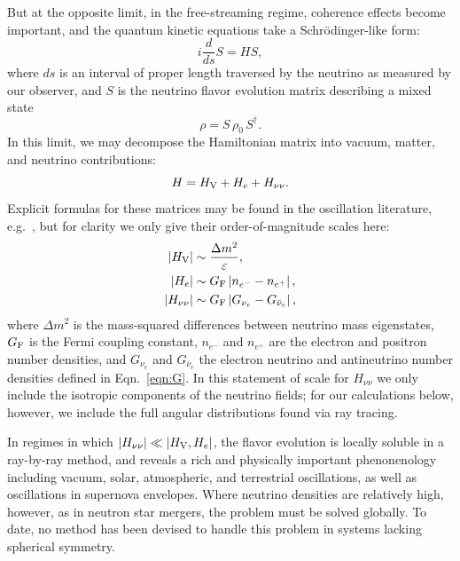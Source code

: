 \documentclass[aps,floatfix,prd,superscriptaddress,twocolumn]{revtex4-1}
\begin{document}
But at the opposite limit, in the free-streaming regime,
coherence effects become important,
and the quantum kinetic equations take a Schr\"{o}dinger-like form:
\begin{equation}
  \label{eqn:schroedinger}
  i \frac{d}{ds} S = H S,
\end{equation}
where $ds$ is an interval of proper length traversed by the neutrino as
measured by our observer, and
$S$ is the neutrino flavor evolution matrix describing a mixed state
\begin{equation}
  \label{eq:density_evolution}
  \rho = S \, \rho_0 \, S^\dagger.
\end{equation}
In this limit, we may decompose the Hamiltonian matrix into vacuum,
matter, and neutrino contributions:
\begin{equation}
  \label{eqn:decompose_H}
  H = H_{\rm V} + H_e + H_{\nu\nu}.
\end{equation}
Explicit formulas for these matrices may be found in the oscillation literature,
e.g.\ \cite{duan2009-review},
but for clarity we only give their order-of-magnitude scales here:
\begin{align}
  \label{eqn:scale_H_V}
  |H_{\rm V}| &\sim \frac{\Delta m^2}{\varepsilon}, \\
  \label{eqn:scale_H_e}
  |H_e|       &\sim G_{\rm F}\left|n_{e^-}-n_{e^+}\right|, \\
  \label{eqn:scale_H_nunu}
  |H_{\nu\nu}|&\sim G_{\rm F} \left|G_{\nu_e}-G_{\bar{\nu}_e}\right|,
\end{align}
where $\Delta m^2$ is the mass-squared differences between neutrino mass
eigenstates,
$G_{\rm F}$ is the Fermi coupling constant,
$n_{e^-}$ and $n_{e^+}$ are the electron and positron number densities,
and $G_{\nu_e}$ and $G_{\bar{\nu}_e}$ the electron neutrino and antineutrino
number densities defined in Eqn.~\ref{eqn:G}.
In this statement of scale for $H_{\nu\nu}$ we only include the isotropic
components of the neutrino fields; for our calculations below, however, we
include the full angular distributions found via ray tracing.

In regimes in which $|H_{\nu\nu}|\ll|H_{\rm V},H_e|$,
the flavor evolution is locally soluble in a ray-by-ray method,
and reveals a rich and physically important phenonenology including
vacuum, solar, atmospheric, and terrestrial oscillations,
as well as oscillations in supernova envelopes.
Where neutrino densities are relatively high, however,
as in neutron star mergers, the problem must be solved globally.
To date, no method has been devised to handle this problem in systems lacking
spherical symmetry.
\end{document}
